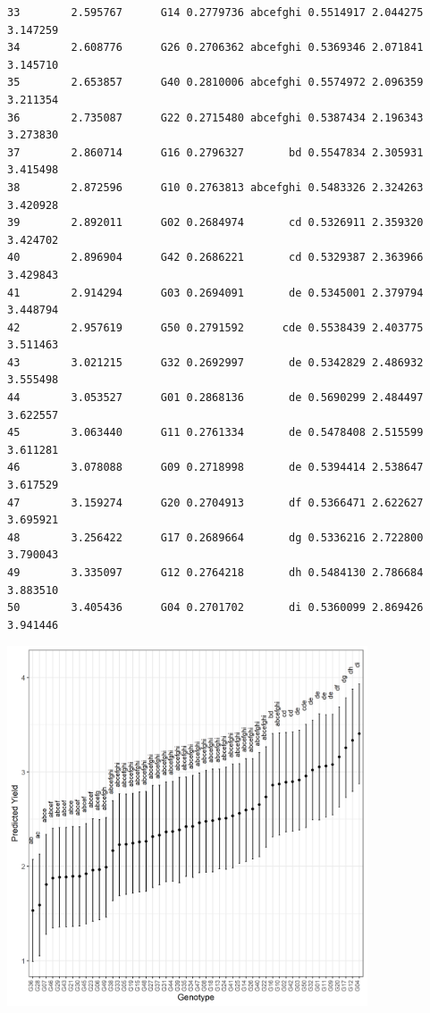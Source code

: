 \documentclass[a4paper, 10pt, fleqn, twosided]{memoir}
\begin{document}
\begin{tcolorbox}[title = Exercise 16 output continued]
\begin{verbatim}
33        2.595767      G14 0.2779736 abcefghi 0.5514917 2.044275 3.147259
34        2.608776      G26 0.2706362 abcefghi 0.5369346 2.071841 3.145710
35        2.653857      G40 0.2810006 abcefghi 0.5574972 2.096359 3.211354
36        2.735087      G22 0.2715480 abcefghi 0.5387434 2.196343 3.273830
37        2.860714      G16 0.2796327       bd 0.5547834 2.305931 3.415498
38        2.872596      G10 0.2763813 abcefghi 0.5483326 2.324263 3.420928
39        2.892011      G02 0.2684974       cd 0.5326911 2.359320 3.424702
40        2.896904      G42 0.2686221       cd 0.5329387 2.363966 3.429843
41        2.914294      G03 0.2694091       de 0.5345001 2.379794 3.448794
42        2.957619      G50 0.2791592      cde 0.5538439 2.403775 3.511463
43        3.021215      G32 0.2692997       de 0.5342829 2.486932 3.555498
44        3.053527      G01 0.2868136       de 0.5690299 2.484497 3.622557
45        3.063440      G11 0.2761334       de 0.5478408 2.515599 3.611281
46        3.078088      G09 0.2718998       de 0.5394414 2.538647 3.617529
47        3.159274      G20 0.2704913       df 0.5366471 2.622627 3.695921
48        3.256422      G17 0.2689664       dg 0.5336216 2.722800 3.790043
49        3.335097      G12 0.2764218       dh 0.5484130 2.786684 3.883510
50        3.405436      G04 0.2701702       di 0.5360099 2.869426 3.941446
\end{verbatim}
\end{tcolorbox}

\begin{tcolorbox}[title = Exercise 16 output continued]
\includegraphics[width=0.8\textwidth, frame]{Exercise16GenoPred.png}
\end{tcolorbox}
\end{document}
